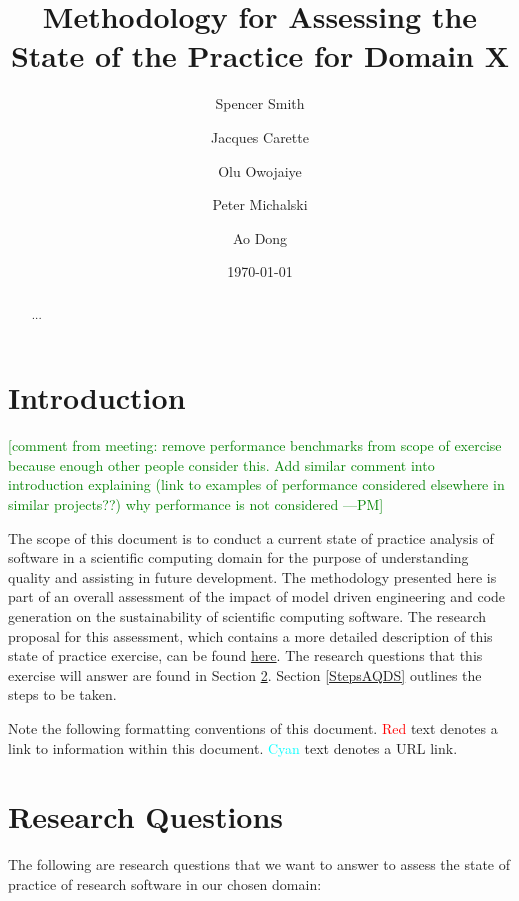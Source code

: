 \documentclass[letterpaper,cleveref]{lipics-v2019}
\title{Methodology for Assessing the State of the Practice for Domain X}
\author{Spencer Smith}{McMaster University, Canada}{smiths@mcmaster.ca}{}{}
\author{Jacques Carette}{McMaster University, Canada}{carette@mcmaster.ca}{}{}
\author{Olu Owojaiye}{McMaster University, Canada}{owojaiyo@mcmaster.ca}{}{}
\author{Peter Michalski}{McMaster University, Canada}{michap@mcmaster.ca}{}{}
\author{Ao Dong}{McMaster University, Canada}{donga9@mcmaster.ca}{}{}
\date{\today}
\newcommand{\authornote}[3]{\textcolor{#1}{[#3 ---#2]}}
\newcommand{\authornote}[3]{}
\newcommand{\pmi}[1]{\authornote{green}{PM}{#1}} %
\theoremstyle{definition}
\begin{document}
\maketitle

\begin{abstract}
	...
\end{abstract}

\tableofcontents

\section{Introduction} \label{SecIntroduction}

\pmi{comment from meeting: remove performance benchmarks from scope of exercise because enough other people consider this. Add similar comment into introduction explaining (link to examples of performance considered elsewhere in similar projects??) why performance is not considered}

The scope of this document is to conduct a current state of practice analysis of software in a scientific computing domain for the purpose of understanding quality and assisting in future development. The methodology presented here is part of an overall assessment of the impact of model driven engineering and code generation on the sustainability of scientific computing software. The research proposal for this assessment, which contains a more detailed description of this state of practice exercise, can be found \href{https://github.com/smiths/AIMSS/blob/master/OverallResearchProposal/ResearchProposal.pdf}{here}. The research questions that this exercise will answer are found in Section \ref{ResearchQuestions}. Section \ref{StepsAQDS} outlines the steps to be taken. 
 
 Note the following formatting conventions of this document. \textcolor{red}{Red} text denotes a link to information within this document. \textcolor{cyan}{Cyan} text denotes a URL link.


\section{Research Questions}\label{ResearchQuestions}

The following are research questions that we want to answer to assess the state of practice of research software in our chosen domain:
\end{document}
